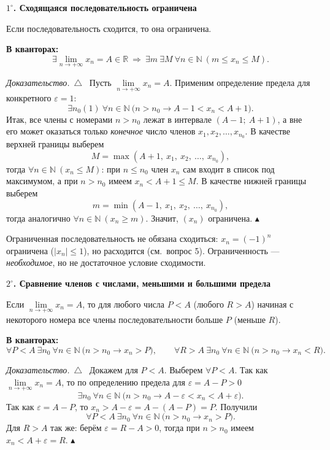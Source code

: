 \documentclass[a4paper,11pt]{article}
\newcommand{\N}{\mathbb{N}}
\newcommand{\R}{\mathbb{R}}
\newcommand{\eps}{\varepsilon}
\newcommand{\kv}{\par\noindent\textbf{\textcolor{oprc!85!black}{В кванторах:}}}
\newenvironment{dok}
  {\par\smallskip\noindent\textit{Доказательство.}\ $\triangle$\ \ignorespaces}
  {\unskip\nobreak\hfill$\blacktriangle$\par\smallskip}
\newcommand{\podr}[1]{\par\needspace{8\baselineskip}\medskip
  {\large\bfseries\textcolor{oprc!80!black}{#1}}\par\nopagebreak\smallskip}
\begin{document}
\podr{$1^\circ$. Сходящаяся последовательность ограничена}

\begin{teo}[$1^\circ$]
Если последовательность сходится, то она ограничена.
\kv
\[
  \exists \lim_{n \to +\infty} x_n = A \in \R \ \Longrightarrow\
  \exists m\ \exists M\ \forall n \in \N\ (m \le x_n \le M).
\]
\end{teo}

\begin{dok}
Пусть $\lim\limits_{n \to +\infty} x_n = A$. Применим определение предела для конкретного $\eps = 1$:
\[
  \exists n_0(1)\ \forall n \in \N\ \bigl(n > n_0 \to A - 1 < x_n < A + 1\bigr).
\]
Итак, все члены с номерами $n > n_0$ лежат в интервале $(A - 1;\ A + 1)$, а вне его может оказаться только
\emph{конечное} число членов $x_1, x_2, \dots, x_{n_0}$. В качестве верхней границы выберем
\[
  M = \max(A + 1,\ x_1,\ x_2,\ \dots,\ x_{n_0}),
\]
тогда $\forall n \in \N\ (x_n \le M)$: при $n \le n_0$ член $x_n$ сам входит в список под максимумом,
а при $n > n_0$ имеем $x_n < A + 1 \le M$. В качестве нижней границы выберем
\[
  m = \min(A - 1,\ x_1,\ x_2,\ \dots,\ x_{n_0}),
\]
тогда аналогично $\forall n \in \N\ (x_n \ge m)$. Значит, $(x_n)$ ограничена.
\end{dok}

\begin{dop}
Ограниченная последовательность не обязана сходиться: $x_n = (-1)^n$ ограничена ($|x_n| \le 1$), но расходится
(см.\ вопрос 5). Ограниченность --- \emph{необходимое}, но не достаточное условие сходимости.
\end{dop}

\podr{$2^\circ$. Сравнение членов с числами, меньшими и большими предела}

\begin{teo}[$2^\circ$]
Если $\lim\limits_{n \to +\infty} x_n = A$, то для любого числа $P < A$ (любого $R > A$) начиная с некоторого номера
все члены последовательности больше $P$ (меньше $R$).
\kv
\[
  \forall P < A\ \exists n_0\ \forall n \in \N\ \bigl(n > n_0 \to x_n > P\bigr), \qquad
  \forall R > A\ \exists n_0\ \forall n \in \N\ \bigl(n > n_0 \to x_n < R\bigr).
\]
\end{teo}

\begin{dok}
Докажем для $P < A$. Выберем $\forall P < A$. Так как $\lim\limits_{n \to +\infty} x_n = A$, то по определению предела
для $\eps = A - P > 0$
\[
  \exists n_0\ \forall n \in \N\ \bigl(n > n_0 \to A - \eps < x_n < A + \eps\bigr).
\]
Так как $\eps = A - P$, то $x_n > A - \eps = A - (A - P) = P$. Получили
\[
  \forall P < A\ \exists n_0\ \forall n \in \N\ \bigl(n > n_0 \to x_n > P\bigr).
\]
Для $R > A$ так же: берём $\eps = R - A > 0$, тогда при $n > n_0$ имеем $x_n < A + \eps = R$.
\end{dok}
\end{document}
